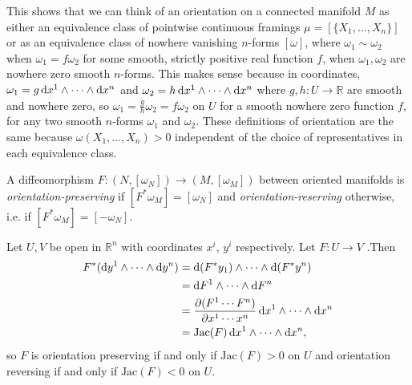 This shows that we can think of an orientation on a connected manifold
$M$ as either an equivalence class of pointwise continuous framings
$\mu = [\{X_1, \dots, X_n\}]$ or as an
equivalence class of nowhere vanishing $n$-forms $[\omega]$, where
$\omega_1 \sim \omega_2$ when $\omega_1 = f \omega_2$ for some smooth,
strictly positive real function $f$, when $\omega_1, \omega_2$ are nowhere zero
smooth $n$-forms. This makes sense because in coordinates,
$\omega_1 = g \mathop{}\!\mathrm{d} x^1 \wedge \cdots \wedge \mathop{}\!\mathrm{d} x^n$ and
$\omega_2 = h \mathop{}\!\mathrm{d} x^1 \wedge \cdots \wedge \mathop{}\!\mathrm{d} x^n$ where
$g, h : U \to \mathbb{R}$ are smooth and nowhere zero, so
$\omega_1 = \frac{g}{h} \omega_2 = f \omega_2$ on $U$ for a smooth
nowhere zero function $f$, for any two smooth $n$-forms $\omega_1$ and
$\omega_2$. These definitions of orientation are the same because
$\omega(X_1, \dots, X_n) > 0$ independent of the choice of
representatives in each equivalence class.

\begin{defn}
A diffeomorphism
$F : (N, [\omega_N]) \to (M, [\omega_M])$ between oriented manifolds is
\emph{orientation-preserving} if $[F^\ast \omega_M] = [\omega_N]$ and
\emph{orientation-reserving} otherwise, i.e. if
$[F^\ast \omega_M] = [-\omega_N]$.
\end{defn}

Let $U, V$ be open in $\mathbb{R}^n$ with coordinates $x^i$, $y^i$
respectively. Let $F: U \to V$ .Then
\begin{align*}
   F^\ast(\dif y^1 \wedge \cdots \wedge \dif y^n)
&= \dif(F^\ast y_1) \wedge \cdots \wedge \dif (F^\ast y^n) \\
&= \dif F^1 \wedge \cdots \wedge \dif F^n \\
&= \frac{\partial (F^1 \cdots F^n)}{\partial x^1 \cdots x^n}
     \dif x^1 \wedge \cdots \wedge \dif x^n \\
&= \mathrm{Jac}(F) \dif x^1 \wedge \cdots \wedge \dif x^n,
\end{align*}
so $F$ is orientation preserving if and only if
$\mathrm{Jac}(F) > 0$ on $U$ and orientation reversing if and only if
$\mathrm{Jac}(F) < 0$ on $U$.

